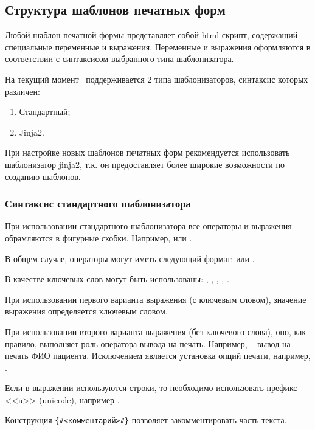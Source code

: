 \subsection{Структура шаблонов печатных форм}

Любой шаблон печатной формы представляет собой html-скрипт, содержащий специальные переменные и выражения. Переменные и выражения оформляются в соответствии с синтаксисом выбранного типа шаблонизатора.

На текущий момент \tmis~поддерживается 2 типа шаблонизаторов, синтаксис которых различен:
\begin{enumerate}
 \item Стандартный;
 \item Jinja2.
\end{enumerate}
 
При настройке новых шаблонов печатных форм рекомендуется использовать шаблонизатор jinja2, т.к. он предоставляет более широкие возможности по созданию шаблонов.

\subsubsection{Синтаксис стандартного шаблонизатора}

При использовании стандартного шаблонизатора все операторы и выражения обрамляются в фигурные скобки. Например,  или .

В общем случае, операторы могут иметь следующий формат:
 или .

В качестве ключевых слов могут быть использованы: , , , , .

При использовании первого варианта выражения (с ключевым словом), значение выражения определяется ключевым словом.

При использовании второго варианта выражения (без ключевого слова), оно, как правило, выполняет роль оператора вывода на печать. Например,  – вывод на печать ФИО пациента. Исключением является установка опций печати, например, .

Если в выражении используются строки, то необходимо использовать префикс <<u>> (unicode), например .

Конструкция \verb|{#<комментарий>#}| позволяет закомментировать часть текста.

